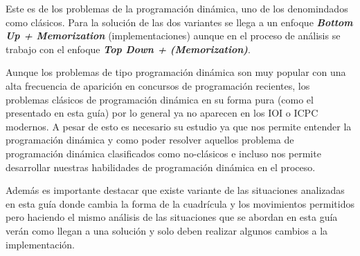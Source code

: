 Este es de los problemas de la programación dinámica, uno de los denomindados como clásicos. Para la solución de las dos variantes se llega a un enfoque \textbf{\emph{Bottom Up + Memorization}} (implementaciones) aunque en el proceso de análisis se trabajo con el enfoque \textbf{\emph{Top Down + (Memorization)}}. 

Aunque los problemas de tipo programación dinámica son muy popular con una alta frecuencia de aparición en concursos de programación
recientes, los problemas clásicos de programación dinámica en su forma pura (como el presentado en esta guía) por lo general ya no aparecen en los IOI o ICPC modernos. A pesar de esto es necesario su estudio ya
que nos permite entender la programación dinámica y como poder resolver aquellos problema de programación dinámica clasificados como no-clásicos e incluso nos permite desarrollar nuestras habilidades de programación dinámica en el proceso.

Además es importante destacar que existe variante de las situaciones analizadas en esta guía donde cambia la forma de la cuadrícula y los movimientos permitidos pero haciendo el mismo análisis de las situaciones que se abordan en esta guía verán como llegan a una solución y solo deben realizar algunos cambios a la implementación.